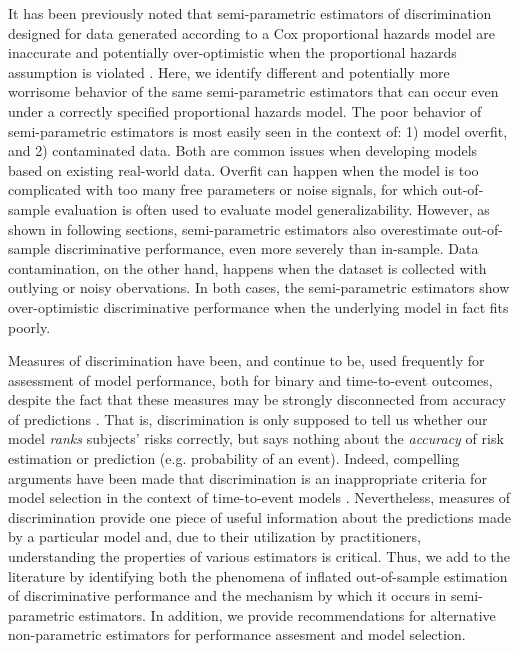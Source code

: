 \documentclass[useAMS,usenatbib, referee]{biom}
\begin{document}
It has been previously noted that semi-parametric estimators of discrimination designed for data generated according to a Cox proportional hazards model are inaccurate and potentially over-optimistic when the proportional hazards assumption is violated \citep{Schmid2013}. Here, we identify different and potentially more worrisome behavior of the same semi-parametric estimators that can occur even under a correctly specified proportional hazards model. The poor behavior of semi-parametric estimators is most easily seen in the context of: 1) model overfit, and 2) contaminated data. Both are common issues when developing models based on existing real-world data. Overfit can happen when the model is too complicated with too many free parameters or noise signals, for which out-of-sample evaluation is often used to evaluate model generalizability. However, as shown in following sections, semi-parametric estimators also overestimate out-of-sample discriminative performance, even more severely than in-sample. Data contamination, on the other hand, happens when the dataset is collected with outlying or noisy obervations. In both cases, the semi-parametric estimators show over-optimistic discriminative performance when the underlying model in fact fits poorly. 

Measures of discrimination have been, and continue to be, used frequently for assessment of model performance, both for binary and time-to-event outcomes, despite the fact that these measures may be strongly disconnected from accuracy of predictions \citep{lobo2008}. That is, discrimination is only supposed to tell us whether our model {\it ranks} subjects' risks correctly, but says nothing about the {\it accuracy} of risk estimation or prediction (e.g. probability of an event). Indeed, compelling arguments have been made that discrimination is an inappropriate criteria for model selection in the context of time-to-event models \citep{blanche2018}. Nevertheless, measures of discrimination provide one piece of useful information about the predictions made by a particular model and, due to their utilization by practitioners, understanding the properties of various estimators is critical. Thus, we add to the literature by identifying both the phenomena of inflated out-of-sample estimation of discriminative performance and the mechanism by which it occurs in semi-parametric estimators. In addition, we provide recommendations for alternative non-parametric estimators for performance assesment and model selection.
\end{document}
